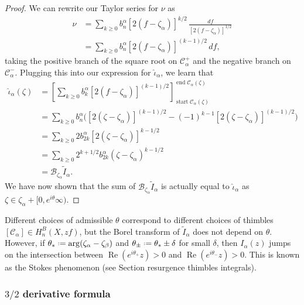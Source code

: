 \documentclass[11pt,a4paper,twoside,leqno,noamsfonts]{amsart}
\numberwithin{equation}{section}
\begin{document}
\begin{proof}
We can rewrite our Taylor series for $\nu$ as
\begin{align*}
\nu & = \sum_{k \ge 0} b_n^\alpha [2(f - \zeta_\alpha)]^{k/2}\,\frac{df}{[2(f - \zeta_\alpha)]^{1/2}} \\
& = \sum_{k \ge 0} b_n^\alpha [2(f - \zeta_\alpha)]^{(k - 1)/2}\,df,
\end{align*}
taking the positive branch of the square root on $\mathcal{C}^+_\alpha$ and the negative branch on $\mathcal{C}^-_\alpha$. Plugging this into our expression for $\hat{\iota}_\alpha$, we learn that
\begin{align*}
\hat{\iota}_\alpha(\zeta) & = \left[ \sum_{k \ge 0} b_k^\alpha [2(f - \zeta_\alpha)]^{(k - 1)/2} \right]_{\operatorname{start} \mathcal{C}_\alpha(\zeta)}^{\operatorname{end} \mathcal{C}_\alpha(\zeta)} \\
& = \sum_{k \ge 0} b_n^\alpha \Big( [2(\zeta - \zeta_\alpha)]^{(k - 1)/2} - (-1)^{k-1}[2(\zeta - \zeta_\alpha)]^{(k - 1)/2} \Big) \\
& = \sum_{k \ge 0} 2 b_{2k}^\alpha [2(\zeta - \zeta_\alpha)]^{k - 1/2} \\
& = \sum_{k \ge 0} 2^{k+1/2} b_{2k}^\alpha (\zeta - \zeta_\alpha)^{k - 1/2} \\
& = \mathcal{B}_{\zeta_\alpha} \tilde{I}_\alpha.
\end{align*}
We have now shown that the sum of $\mathcal{B}_{\zeta_\alpha} \tilde{I}_\alpha$ is actually equal to $\hat{\iota}_\alpha$ as $\zeta\in\zeta_\alpha+[0,e^{i\theta}\infty)$.
\end{proof}

\begin{remark}
Different choices of admissible $\theta$ correspond to different choices of thimbles $[\mathcal{C}_{\alpha}]\in H_n^{B}(X,zf)$, but the Borel transform of $\tilde{I}_{\alpha}$ does not depend on $\theta$. However, if $\theta_*\defeq\arg(\zeta_{\alpha}-\zeta_{\beta})$ and $\theta_{\pm}\defeq\theta_*\pm\delta$ for small $\delta$, then $I_{\alpha}(z)$ jumps on the intersection between $\operatorname{Re}(e^{i\theta_+}z)>0$ and $\operatorname{Re}(e^{i\theta_-}z)>0$. This is known as the Stokes phenomenon (see Section resurgence thimbles integrals).  
\end{remark}

\subsubsection{$3/2$ derivative formula}
\end{document}
